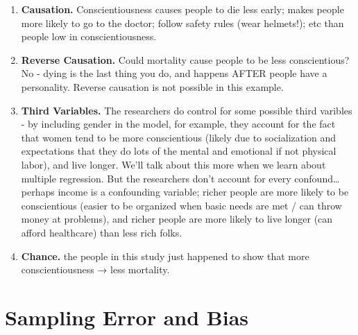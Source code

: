 \documentclass[
  letterpaper,
  DIV=11,
  numbers=noendperiod,
  oneside]{scrreprt}
\begin{document}
\begin{tcolorbox}[enhanced jigsaw, toptitle=1mm, toprule=.15mm, rightrule=.15mm, breakable, left=2mm, colbacktitle=quarto-callout-tip-color!10!white, colback=white, opacityback=0, coltitle=black, bottomtitle=1mm, opacitybacktitle=0.6, titlerule=0mm, leftrule=.75mm, arc=.35mm, bottomrule=.15mm, title=\textcolor{quarto-callout-tip-color}{\faLightbulb}\hspace{0.5em}{Answers to Personality and Longevity Example}, colframe=quarto-callout-tip-color-frame]

\begin{enumerate}
\def\labelenumi{\arabic{enumi}.}
\item
  \textbf{Causation.} Conscientiousness causes people to die less early;
  makes people more likely to go to the doctor; follow safety rules
  (wear helmets!); etc than people low in conscientiousness.
\item
  \textbf{Reverse Causation.} Could mortality cause people to be less
  conscientious? No - dying is the last thing you do, and happens AFTER
  people have a personality. Reverse causation is not possible in this
  example.
\item
  \textbf{Third Variables.} The researchers do control for some possible
  third varibles - by including gender in the model, for example, they
  account for the fact that women tend to be more conscientious (likely
  due to socialization and expectations that they do lots of the mental
  and emotional if not physical labor), and live longer. We'll talk
  about this more when we learn about multiple regression. But the
  researchers don't account for every confound\ldots perhaps income is a
  confounding variable; richer people are more likely to be
  conscientious (easier to be organized when basic needs are met / can
  throw money at problems), and richer people are more likely to live
  longer (can afford healthcare) than less rich folks.
\item
  \textbf{Chance.} the people in this study just happened to show that
  more conscientiousness → less mortality.
\end{enumerate}

\end{tcolorbox}

\chapter{Sampling Error and Bias}\label{sampling-error-and-bias}
\end{document}
